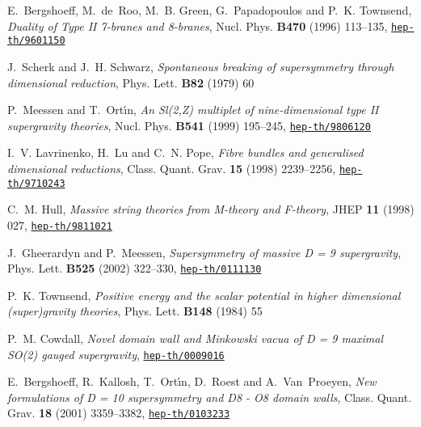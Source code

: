 \documentclass[12pt,a4paper]{article}
\begin{document}
\begin{thebibliography}{10}
E.~Bergshoeff, M.~de~Roo, M.~B. Green, G.~Papadopoulos  and P.~K. Townsend,
  \emph{Duality of Type II 7-branes and 8-branes}, Nucl. Phys. {\bf B470}
  (1996) 113--135,
\href{http://arXiv.org/abs/hep-th/9601150}{{\tt hep-th/9601150}}

J.~Scherk and J.~H. Schwarz, \emph{Spontaneous breaking of supersymmetry
  through dimensional reduction}, Phys. Lett. {\bf B82} (1979)
60

P.~Meessen and T.~Ort\'\i{}n, \emph{An Sl(2,Z) multiplet of nine-dimensional
  type II supergravity theories}, Nucl. Phys. {\bf B541} (1999) 195--245,
\href{http://arXiv.org/abs/hep-th/9806120}{{\tt hep-th/9806120}}

I.~V. Lavrinenko, H.~Lu  and C.~N. Pope, \emph{Fibre bundles and generalised
  dimensional reductions}, Class. Quant. Grav. {\bf 15} (1998) 2239--2256,
\href{http://arXiv.org/abs/hep-th/9710243}{{\tt hep-th/9710243}}

C.~M. Hull, \emph{Massive string theories from M-theory and F-theory}, JHEP
  {\bf 11} (1998) 027,
\href{http://arXiv.org/abs/hep-th/9811021}{{\tt hep-th/9811021}}

J.~Gheerardyn and P.~Meessen, \emph{Supersymmetry of massive D = 9
  supergravity}, Phys. Lett. {\bf B525} (2002) 322--330,
\href{http://arXiv.org/abs/hep-th/0111130}{{\tt hep-th/0111130}}

P.~K. Townsend, \emph{Positive energy and the scalar potential in higher
  dimensional (super)gravity theories}, Phys. Lett. {\bf B148} (1984)
55

P.~M. Cowdall, \emph{Novel domain wall and Minkowski vacua of D = 9 maximal
  SO(2) gauged supergravity},
\href{http://arXiv.org/abs/hep-th/0009016}{{\tt hep-th/0009016}}

E.~Bergshoeff, R.~Kallosh, T.~Ort\'\i{}n, D.~Roest  and A.~Van~Proeyen,
  \emph{New formulations of D = 10 supersymmetry and D8 - O8 domain walls},
  Class. Quant. Grav. {\bf 18} (2001) 3359--3382,
\href{http://arXiv.org/abs/hep-th/0103233}{{\tt hep-th/0103233}}


\end{thebibliography}
\end{document}
